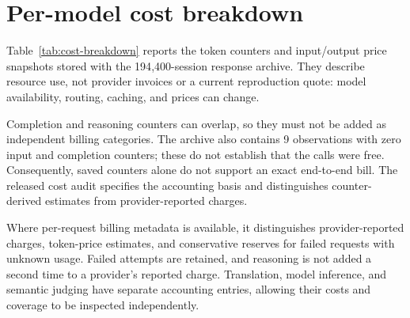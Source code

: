 \documentclass{article}
\begin{document}
\section{Per-model cost breakdown}
\label{app:cost-breakdown}

Table~\ref{tab:cost-breakdown} reports the token counters and input/output
price snapshots stored with the 194{,}400-session response archive. They
describe resource use, not provider invoices or a current reproduction
quote: model availability, routing, caching, and prices can change.

Completion and reasoning counters can overlap, so they must not be added
as independent billing categories. The archive also contains 9 observations
with zero input and completion counters; these do not establish that the
calls were free. Consequently, saved counters alone do not support an exact
end-to-end bill. The released cost audit specifies the accounting basis and
distinguishes counter-derived estimates from provider-reported charges.



Where per-request billing metadata is available, it distinguishes
provider-reported charges, token-price estimates, and conservative reserves
for failed requests with unknown usage. Failed attempts are retained, and
reasoning is not added a second time to a provider's reported charge.
Translation, model inference, and semantic judging have separate accounting
entries, allowing their costs and coverage to be inspected independently.



\end{document}
